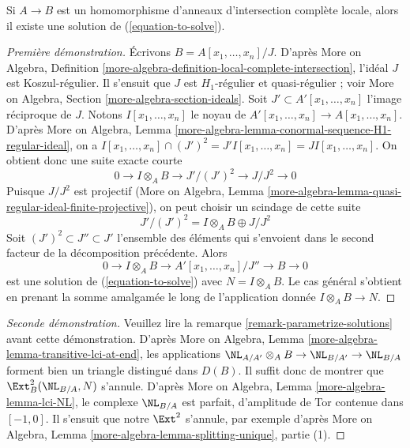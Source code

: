 \begin{lemma}
\label{lemma-existence-lci}
Si $A \to B$ est un homomorphisme d'anneaux d'intersection complète locale, alors
il existe une solution de (\ref{equation-to-solve}).
\end{lemma}

\begin{proof}[Première démonstration]
Écrivons $B = A[x_1, \ldots, x_n]/J$. D'après More on Algebra, Definition
\ref{more-algebra-definition-local-complete-intersection},
l'idéal $J$ est Koszul-régulier. Il s'ensuit que $J$ est $H_1$-régulier et
quasi-régulier ; voir More on Algebra, Section \ref{more-algebra-section-ideals}.
Soit $J' \subset A'[x_1, \ldots, x_n]$
l'image réciproque de $J$. Notons $I[x_1, \ldots, x_n]$ le
noyau de $A'[x_1, \ldots, x_n] \to A[x_1, \ldots, x_n]$.
D'après More on Algebra, Lemma
\ref{more-algebra-lemma-conormal-sequence-H1-regular-ideal}, on a
$I[x_1, \ldots, x_n] \cap (J')^2 = J'I[x_1, \ldots, x_n] =
JI[x_1, \ldots, x_n]$. On obtient donc une suite exacte courte
$$
0 \to I \otimes_A B \to J'/(J')^2 \to J/J^2 \to 0
$$
Puisque $J/J^2$ est projectif (More on Algebra, Lemma
\ref{more-algebra-lemma-quasi-regular-ideal-finite-projective}),
on peut choisir un scindage de cette suite
$$
J'/(J')^2 = I \otimes_A B \oplus J/J^2 
$$
Soit $(J')^2 \subset J'' \subset J'$ l'ensemble des éléments qui s'envoient dans le
second facteur de la décomposition précédente. Alors
$$
0 \to I \otimes_A B \to A'[x_1, \ldots, x_n]/J'' \to B \to 0
$$
est une solution de (\ref{equation-to-solve}) avec $N = I \otimes_A B$.
Le cas général s'obtient en prenant la somme amalgamée le long de l'application donnée
$I \otimes_A B \to N$.
\end{proof}

\begin{proof}[Seconde démonstration]
Veuillez lire la remarque \ref{remark-parametrize-solutions}
avant cette démonstration. D'après
More on Algebra, Lemma \ref{more-algebra-lemma-transitive-lci-at-end},
les applications $\NL_{A/A'} \otimes_A B \to \NL_{B/A'} \to \NL_{B/A}$
forment bien un triangle distingué dans $D(B)$.
Il suffit donc de montrer que $\Ext^2_B(\NL_{B/A}, N)$ s'annule.
D'après More on Algebra, Lemma \ref{more-algebra-lemma-lci-NL},
le complexe $\NL_{B/A}$ est parfait, d'amplitude de Tor contenue dans
$[-1, 0]$. Il s'ensuit que notre $\Ext^2$ s'annule, par exemple
d'après More on Algebra, Lemma \ref{more-algebra-lemma-splitting-unique}, partie (1).
\end{proof}






